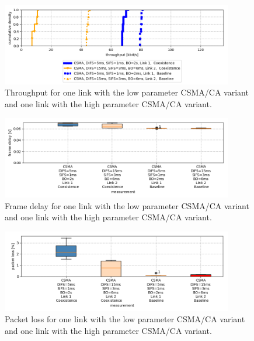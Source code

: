 \begin{figure}[tb]
	\label{fig:results-csma-15-5-throughput}
	\begin{center}
		\includegraphics[width=0.9\textwidth]{pictures/results/different_combinations/csma_inhomogeneous/15_5/throughput_cdf}
	\end{center}
	\caption{Throughput for one link with the low parameter CSMA/CA variant and one link with the high parameter CSMA/CA variant.}
\end{figure}

\begin{figure}[tb]
	\label{fig:results-csma-15-5-frame-delay}
	\begin{center}
		\includegraphics[width=0.9\textwidth]{pictures/results/different_combinations/csma_inhomogeneous/15_5/frame_delay_boxplot}
	\end{center}
	\caption{Frame delay for one link with the low parameter CSMA/CA variant and one link with the high parameter CSMA/CA variant.}
\end{figure}

\begin{figure}[bt]
	\label{fig:results-csma-15-5-packet-loss}
	\begin{center}
		\includegraphics[width=0.9\textwidth]{pictures/results/different_combinations/csma_inhomogeneous/15_5/packet_loss_boxplot}	
	\end{center}
	\caption{Packet loss for one link with the low parameter CSMA/CA variant and one link with the high parameter CSMA/CA variant.}
\end{figure}

